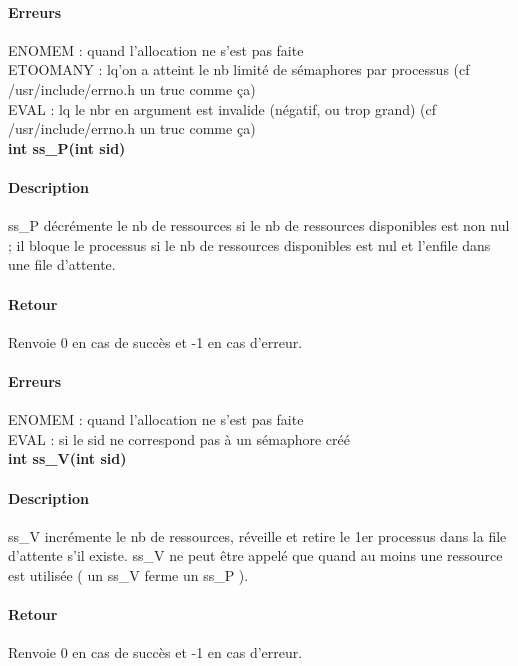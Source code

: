 \documentclass[12pt]{article}
\begin{document}
      \paragraph{Erreurs\\}
      ENOMEM : quand l'allocation ne s'est pas faite \\
      ETOOMANY : lq'on a atteint le nb limité de sémaphores par processus (cf /usr/include/errno.h un truc comme ça) \\
      EVAL : lq le nbr en argument est invalide (négatif, ou trop grand) (cf /usr/include/errno.h un truc comme ça) \\

      \newpage
      \textbf{int ss\_P(int sid)} \\
      \paragraph{Description\\}
      ss\_P décrémente le nb de ressources si le nb de ressources disponibles est non nul ; il bloque le processus si le nb de ressources disponibles est nul et l'enfile dans une file d'attente.
      \paragraph{Retour\\}
      Renvoie 0 en cas de succès et -1 en cas d'erreur.
      \paragraph{Erreurs\\}
      ENOMEM : quand l'allocation ne s'est pas faite \\
      EVAL : si le sid ne correspond pas à un sémaphore créé \\

      \newpage
      \textbf{int ss\_V(int sid)} \\
      \paragraph{Description\\}
      ss\_V incrémente le nb de ressources, réveille et retire le 1er processus dans la file d'attente s'il existe. ss\_V ne peut être appelé que quand au moins une ressource est utilisée ( un ss\_V ferme un ss\_P ).
      \paragraph{Retour\\}
      Renvoie 0 en cas de succès et -1 en cas d'erreur.
\end{document}
